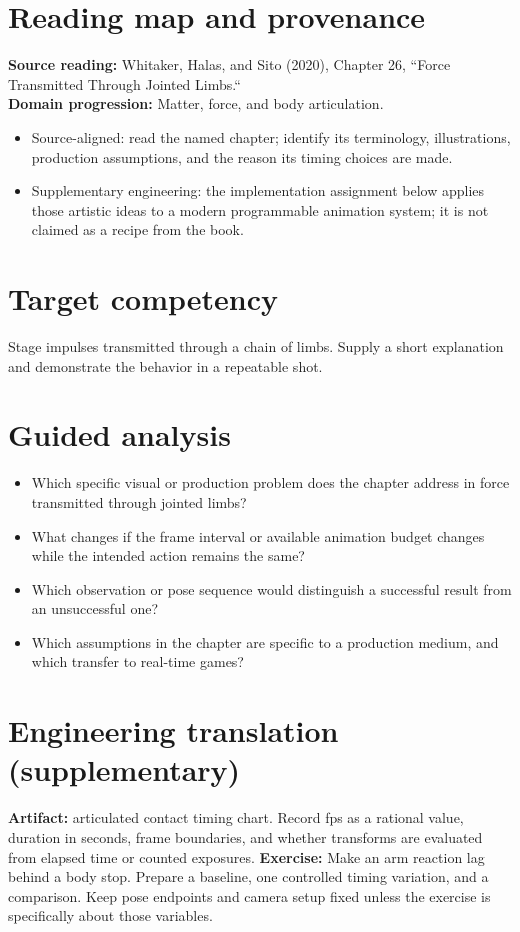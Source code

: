 \documentclass[10pt,letterpaper]{article}
\begin{document}
\makedoctitle
\makedocsummary

\section{Reading map and provenance}
\textbf{Source reading:} Whitaker, Halas, and Sito (2020), Chapter 26, ``Force Transmitted Through Jointed Limbs.``\\
\textbf{Domain progression:} Matter, force, and body articulation.
\begin{itemize}
\item Source-aligned: read the named chapter; identify its terminology, illustrations, production assumptions, and the reason its timing choices are made.
\item Supplementary engineering: the implementation assignment below applies those artistic ideas to a modern programmable animation system; it is not claimed as a recipe from the book.
\end{itemize}
\section{Target competency}
Stage impulses transmitted through a chain of limbs. Supply a short explanation and demonstrate the behavior in a repeatable shot.
\section{Guided analysis}
\begin{itemize}
\item Which specific visual or production problem does the chapter address in force transmitted through jointed limbs?
\item What changes if the frame interval or available animation budget changes while the intended action remains the same?
\item Which observation or pose sequence would distinguish a successful result from an unsuccessful one?
\item Which assumptions in the chapter are specific to a production medium, and which transfer to real-time games?
\end{itemize}
\section{Engineering translation (supplementary)}
\textbf{Artifact:} articulated contact timing chart. Record fps as a rational value, duration in seconds, frame boundaries, and whether transforms are evaluated from elapsed time or counted exposures.
\textbf{Exercise:} Make an arm reaction lag behind a body stop. Prepare a baseline, one controlled timing variation, and a comparison. Keep pose endpoints and camera setup fixed unless the exercise is specifically about those variables.
\end{document}
